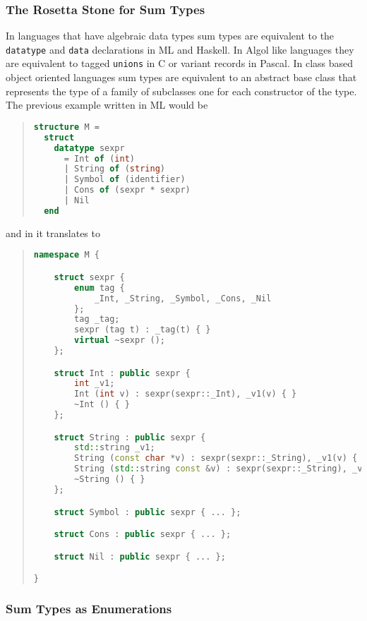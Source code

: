 \subsubsection{The Rosetta Stone for Sum Types}
\label{sec:rosetta-stone}

In languages that have algebraic data types sum types are equivalent to the
\lstinline[language=ASDL]!datatype! and \lstinline[language=ASDL]!data! declarations in ML and Haskell. In Algol like
languages they are equivalent to tagged \lstinline[language=ASDL]!unions! in C or variant records
in Pascal. In class based object oriented languages sum types are equivalent
to an abstract base class that represents the type of a family of subclasses
one for each constructor of the type. The previous example written in ML would
be
\begin{quote}\begin{lstlisting}[language=SML]
structure M =
  struct
    datatype sexpr
      = Int of (int)
      | String of (string)
      | Symbol of (identifier)
      | Cons of (sexpr * sexpr)
      | Nil
  end
\end{lstlisting}\end{quote}%
and in \Cplusplus{} it translates to
\begin{quote}\begin{lstlisting}[language=c++]
namespace M {

    struct sexpr {
        enum tag {
            _Int, _String, _Symbol, _Cons, _Nil
        };
        tag _tag;
        sexpr (tag t) : _tag(t) { }
        virtual ~sexpr ();
    };

    struct Int : public sexpr {
        int _v1;
        Int (int v) : sexpr(sexpr::_Int), _v1(v) { }
        ~Int () { }
    };

    struct String : public sexpr {
        std::string _v1;
        String (const char *v) : sexpr(sexpr::_String), _v1(v) { }
        String (std::string const &v) : sexpr(sexpr::_String), _v1(v) { }
        ~String () { }
    };

    struct Symbol : public sexpr { ... };

    struct Cons : public sexpr { ... };

    struct Nil : public sexpr { ... };

}
\end{lstlisting}\end{quote}%

\subsubsection{Sum Types as Enumerations}
\label{sec:enumerations}

